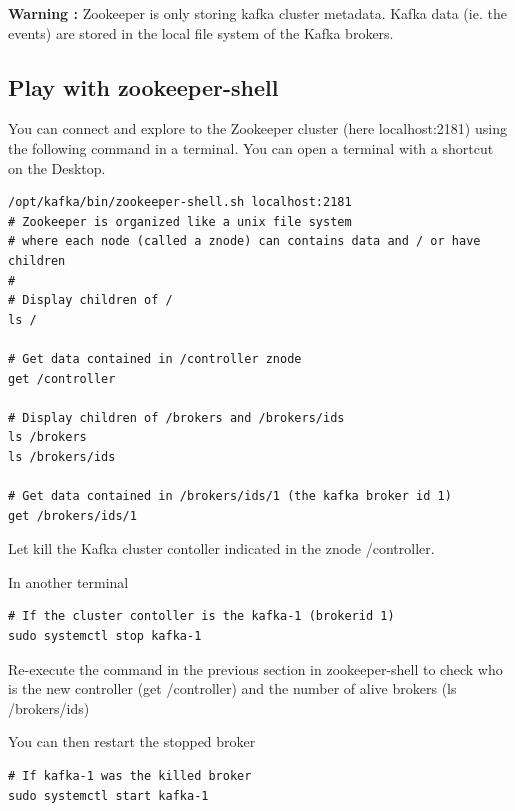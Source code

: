 \documentclass{article}
\newenvironment{warning}
    { \begin{mdframed}[backgroundcolor=blue!20] \textbf{Warning : } }
    {  \end{mdframed}}
\newenvironment{code}
    { \begin{mdframed} }    {  \end{mdframed}}
\begin{document}
\begin{warning}
Zookeeper is only storing kafka cluster metadata. Kafka data (ie. the events) are stored in the local file system of the Kafka brokers.
\end{warning}

\subsection{Play with zookeeper-shell}

You can connect and explore to the Zookeeper cluster (here localhost:2181) using the following command in a terminal. You can open a terminal with a shortcut on the Desktop.
\begin{code}
    \begin{verbatim}
/opt/kafka/bin/zookeeper-shell.sh localhost:2181
# Zookeeper is organized like a unix file system 
# where each node (called a znode) can contains data and / or have children
# 
# Display children of /
ls /

# Get data contained in /controller znode
get /controller

# Display children of /brokers and /brokers/ids
ls /brokers
ls /brokers/ids

# Get data contained in /brokers/ids/1 (the kafka broker id 1)
get /brokers/ids/1
    \end{verbatim}
\end{code}

Let kill the Kafka cluster contoller indicated in the znode /controller.


In another terminal

\begin{code}
    \begin{verbatim}
# If the cluster contoller is the kafka-1 (brokerid 1)
sudo systemctl stop kafka-1
    \end{verbatim}
\end{code}

Re-execute the command in the previous section in zookeeper-shell to check who is the new controller (get /controller) and the number of alive brokers (ls /brokers/ids)

You can then restart the stopped broker

\begin{code}
    \begin{verbatim}
# If kafka-1 was the killed broker
sudo systemctl start kafka-1
    \end{verbatim}
\end{code}
\end{document}
